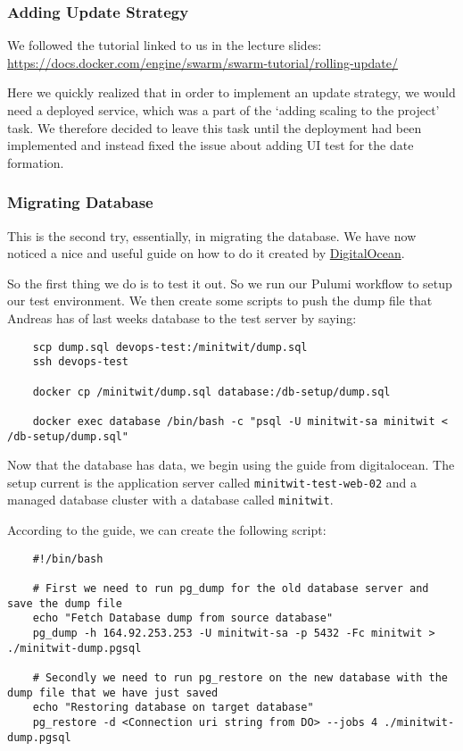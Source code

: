 \subsubsection{Adding Update Strategy}
\label{log:adding-update-strategy}

We followed the tutorial linked to us in the lecture slides: \url{https://docs.docker.com/engine/swarm/swarm-tutorial/rolling-update/}

Here we quickly realized that in order to implement an update strategy, we would need a deployed service, which was a part of the `adding scaling to the project' task. We therefore decided to leave this task until the deployment had been implemented and instead fixed the issue about adding UI test for the date formation.

\subsubsection{Migrating Database}
\label{log:migrating-database}

This is the second try, essentially, in migrating the database. We have now noticed a nice and useful guide on how to do it created by \href{https://docs.digitalocean.com/products/databases/postgresql/how-to/import-databases/}{DigitalOcean}.

So the first thing we do is to test it out. So we run our Pulumi workflow to setup our test environment. We then create some scripts to push the dump file that Andreas has of last weeks database to the test server by saying:
\begin{verbatim}
    scp dump.sql devops-test:/minitwit/dump.sql
    ssh devops-test

    docker cp /minitwit/dump.sql database:/db-setup/dump.sql

    docker exec database /bin/bash -c "psql -U minitwit-sa minitwit < /db-setup/dump.sql"
\end{verbatim}

Now that the database has data, we begin using the guide from digitalocean. The setup current is the application server called \texttt{minitwit-test-web-02} and a managed database cluster with a database called \texttt{minitwit}.

According to the guide, we can create the following script:

\begin{verbatim}
    #!/bin/bash

    # First we need to run pg_dump for the old database server and save the dump file
    echo "Fetch Database dump from source database"
    pg_dump -h 164.92.253.253 -U minitwit-sa -p 5432 -Fc minitwit > ./minitwit-dump.pgsql

    # Secondly we need to run pg_restore on the new database with the dump file that we have just saved
    echo "Restoring database on target database"
    pg_restore -d <Connection uri string from DO> --jobs 4 ./minitwit-dump.pgsql
\end{verbatim}

